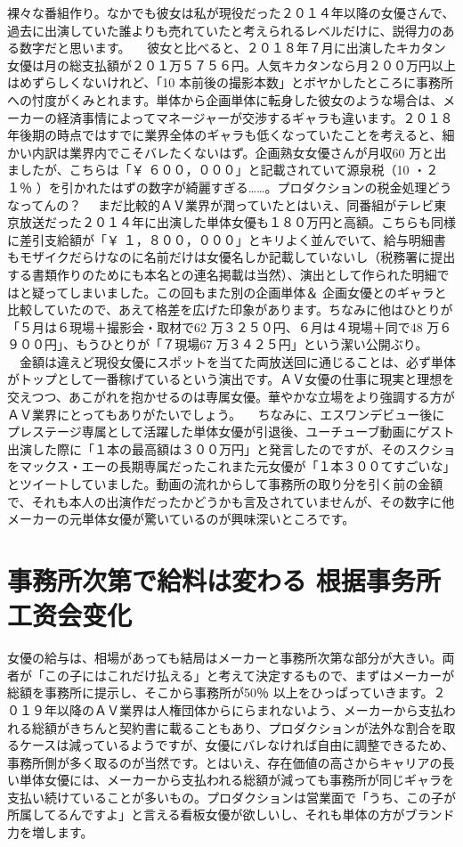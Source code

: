 \documentclass[12pt,UTF8]{ctexbook}
\begin{document}
裸々な番組作り。なかでも彼女は私が現役だった２０１４年以降の女優さんで、過去に出演していた誰よりも売れていたと考えられるレベルだけに、説得力のある数字だと思います。
　彼女と比べると、２０１８年７月に出演したキカタン女優は月の総支払額が２０１万５７５６円。人気キカタンなら月２００万円以上はめずらしくないけれど、「10
 本前後の撮影本数」とボヤかしたところに事務所への忖度がくみとれます。単体から企画単体に転身した彼女のような場合は、メーカーの経済事情によってマネージャーが交渉するギャラも違います。２０１８年後期の時点ではすでに業界全体のギャラも低くなっていたことを考えると、細かい内訳は業界内でこそバレたくないはず。企画熟女女優さんが月収60
 万と出ましたが、こちらは「￥
 ６００，０００」と記載されていて源泉税（10
 ・２１％
 ）を引かれたはずの数字が綺麗すぎる……。プロダクションの税金処理どうなってんの？
　まだ比較的ＡＶ業界が潤っていたとはいえ、同番組がテレビ東京放送だった２０１４年に出演した単体女優も１８０万円と高額。こちらも同様に差引支給額が「￥
 １，８００，０００」とキリよく並んでいて、給与明細書もモザイクだらけなのに名前だけは女優名しか記載していないし（税務署に提出する書類作りのためにも本名との連名掲載は当然）、演出として作られた明細ではと疑ってしまいました。この回もまた別の企画単体＆
 企画女優とのギャラと比較していたので、あえて格差を広げた印象があります。ちなみに他はひとりが「５月は６現場＋撮影会・取材で62
 万３２５０円、６月は４現場＋同で48
 万６９００円」、もうひとりが「７現場67
 万３４２５円」という潔い公開ぶり。
　金額は違えど現役女優にスポットを当てた両放送回に通じることは、必ず単体がトップとして一番稼げているという演出です。ＡＶ女優の仕事に現実と理想を交えつつ、あこがれを抱かせるのは専属女優。華やかな立場をより強調する方がＡＶ業界にとってもありがたいでしょう。
　ちなみに、エスワンデビュー後にプレステージ専属として活躍した単体女優が引退後、ユーチューブ動画にゲスト出演した際に「１本の最高額は３００万円」と発言したのですが、そのスクショをマックス・エーの長期専属だったこれまた元女優が「１本３００てすごいな」とツイートしていました。動画の流れからして事務所の取り分を引く前の金額で、それも本人の出演作だったかどうかも言及されていませんが、その数字に他メーカーの元単体女優が驚いているのが興味深いところです。



\section{事務所次第で給料は変わる
根据事务所工资会变化}

女優の給与は、相場があっても結局はメーカーと事務所次第な部分が大きい。両者が「この子にはこれだけ払える」と考えて決定するもので、まずはメーカーが総額を事務所に提示し、そこから事務所が50％
 以上をひっぱっていきます。２０１９年以降のＡＶ業界は人権団体からにらまれないよう、メーカーから支払われる総額がきちんと契約書に載ることもあり、プロダクションが法外な割合を取るケースは減っているようですが、女優にバレなければ自由に調整できるため、事務所側が多く取るのが当然です。とはいえ、存在価値の高さからキャリアの長い単体女優には、メーカーから支払われる総額が減っても事務所が同じギャラを支払い続けていることが多いもの。プロダクションは営業面で「うち、この子が所属してるんですよ」と言える看板女優が欲しいし、それも単体の方がブランド力を増します。
\end{document}
